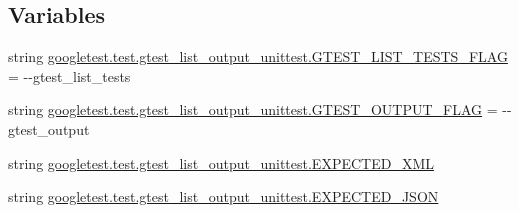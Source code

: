 \subsection*{Variables}
\begin{DoxyCompactItemize}
\item 
string \mbox{\hyperlink{namespacegoogletest_1_1test_1_1gtest__list__output__unittest_a6b3a06ac6e600d73c56aab4252ce8853}{googletest.\+test.\+gtest\+\_\+list\+\_\+output\+\_\+unittest.\+G\+T\+E\+S\+T\+\_\+\+L\+I\+S\+T\+\_\+\+T\+E\+S\+T\+S\+\_\+\+F\+L\+AG}} = \textquotesingle{}-\/-\/gtest\+\_\+list\+\_\+tests\textquotesingle{}
\item 
string \mbox{\hyperlink{namespacegoogletest_1_1test_1_1gtest__list__output__unittest_a75491e5ad76a56822304bd2f9593a535}{googletest.\+test.\+gtest\+\_\+list\+\_\+output\+\_\+unittest.\+G\+T\+E\+S\+T\+\_\+\+O\+U\+T\+P\+U\+T\+\_\+\+F\+L\+AG}} = \textquotesingle{}-\/-\/gtest\+\_\+output\textquotesingle{}
\item 
string \mbox{\hyperlink{namespacegoogletest_1_1test_1_1gtest__list__output__unittest_aae172005b941ec1e744efae81a7c0e05}{googletest.\+test.\+gtest\+\_\+list\+\_\+output\+\_\+unittest.\+E\+X\+P\+E\+C\+T\+E\+D\+\_\+\+X\+ML}}
\item 
string \mbox{\hyperlink{namespacegoogletest_1_1test_1_1gtest__list__output__unittest_a0921d3f52c53ce48d129f3ec4c7fc723}{googletest.\+test.\+gtest\+\_\+list\+\_\+output\+\_\+unittest.\+E\+X\+P\+E\+C\+T\+E\+D\+\_\+\+J\+S\+ON}}
\end{DoxyCompactItemize}
